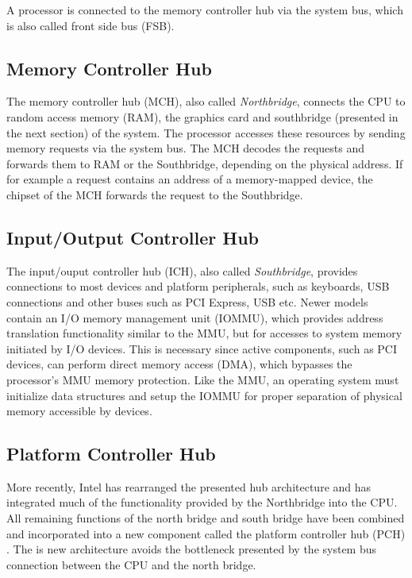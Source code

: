 A processor is connected to the memory controller hub via the system bus, which
is also called front side bus (FSB).

\subsection{Memory Controller Hub}
The memory controller hub (MCH), also called \emph{Northbridge},
connects the CPU to random access memory (RAM), the graphics card and
southbridge (presented in the next section) of the system. The processor
accesses these resources by sending memory requests via the system bus. The MCH
decodes the requests and forwards them to RAM or the Southbridge, depending on
the physical address. If for example a request contains an address of a
memory-mapped device, the chipset of the MCH forwards the request to the
Southbridge.

\subsection{Input/Output Controller Hub}
The input/ouput controller hub (ICH), also called \emph{Southbridge}, provides
connections to most devices and platform peripherals, such as keyboards, USB
connections and other buses such as PCI Express, USB etc. Newer models contain
an I/O memory management unit (IOMMU), which provides address translation
functionality similar to the MMU, but for accesses to system memory initiated by
I/O devices. This is necessary since active components, such as PCI devices, can
perform direct memory access (DMA), which bypasses the processor's
MMU memory protection. Like the MMU, an operating system must initialize data
structures and setup the IOMMU for proper separation of physical memory
accessible by devices.

\subsection{Platform Controller Hub}
More recently, Intel has rearranged the presented hub architecture and has
integrated much of the functionality provided by the Northbridge into the CPU.
All remaining functions of the north bridge and south bridge have been combined
and incorporated into a new component called the platform controller hub (PCH)
. The is new architecture avoids the bottleneck presented by the
system bus connection between the CPU and the north bridge.
